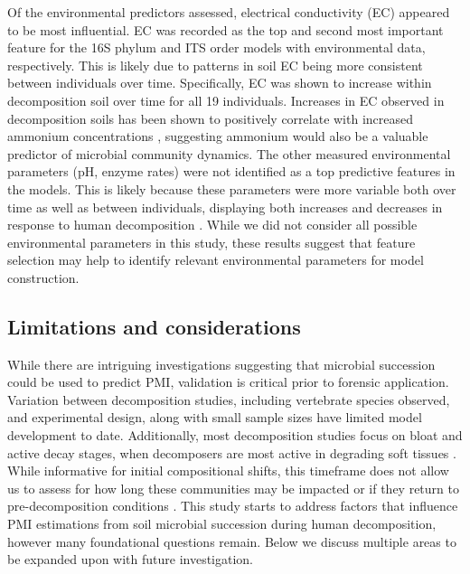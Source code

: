 \documentclass[
  10pt,
  letterpaper,
]{article}
\begin{document}
Of the environmental predictors assessed, electrical conductivity (EC)
appeared to be most influential. EC was recorded as the top and second
most important feature for the 16S phylum and ITS order models with
environmental data, respectively. This is likely due to patterns in soil
EC being more consistent between individuals over time. Specifically, EC
was shown to increase within decomposition soil over time for all 19
individuals. Increases in EC observed in decomposition soils has been
shown to positively correlate with increased ammonium concentrations
\citep{keenan_mortality_2018, keenan_spatial_2019}, suggesting ammonium
would also be a valuable predictor of microbial community dynamics. The
other measured environmental parameters (pH, enzyme rates) were not
identified as a top predictive features in the models. This is likely
because these parameters were more variable both over time as well as
between individuals, displaying both increases and decreases in response
to human decomposition \citep{mason_body_2022}. While we did not
consider all possible environmental parameters in this study, these
results suggest that feature selection may help to identify relevant
environmental parameters for model construction.

\subsection{Limitations and
considerations}\label{limitations-and-considerations}

While there are intriguing investigations suggesting that microbial
succession could be used to predict PMI, validation is critical prior to
forensic application. Variation between decomposition studies, including
vertebrate species observed, and experimental design, along with small
sample sizes have limited model development to date. Additionally, most
decomposition studies focus on bloat and active decay stages, when
decomposers are most active in degrading soft tissues
\citep{payne_summer_1965, carter_cadaver_2007}. While informative for
initial compositional shifts, this timeframe does not allow us to assess
for how long these communities may be impacted or if they return to
pre-decomposition conditions \citep{shade_fundamentals_2012}. This study
starts to address factors that influence PMI estimations from soil
microbial succession during human decomposition, however many
foundational questions remain. Below we discuss multiple areas to be
expanded upon with future investigation.
\end{document}
